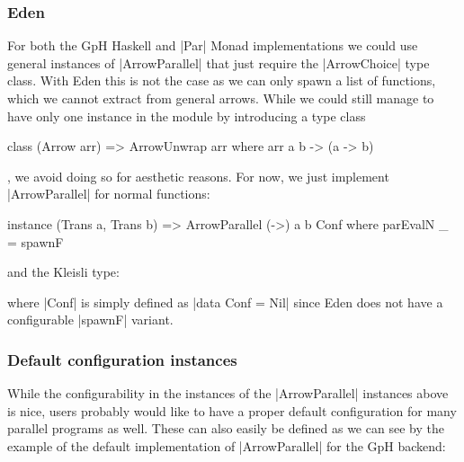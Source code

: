 \subsubsection{Eden}
For both the GpH Haskell and |Par| Monad implementations we could use general instances of |ArrowParallel| that just require the |ArrowChoice| type class. With Eden this is not the case as we can only spawn a list of functions, which we cannot extract from general arrows. While we could still manage to have only one instance in the module by introducing a type class %
\begin{code}
class (Arrow arr) => ArrowUnwrap arr where
	arr a b -> (a -> b)
\end{code}
, we avoid doing so for aesthetic reasons. For now, we just implement |ArrowParallel| for normal functions: %
\begin{code}
instance (Trans a, Trans b) => ArrowParallel (->) a b Conf where
    parEvalN _ = spawnF
\end{code}
and the Kleisli type: %
where |Conf| is simply defined as |data Conf = Nil| since Eden does not have a configurable |spawnF| variant.

\subsubsection{Default configuration instances}
While the configurability in the instances of the |ArrowParallel| instances above is nice, users probably would like to have a proper default configuration for many parallel programs as well. These can also easily be defined as we can see by the example of the default implementation of |ArrowParallel| for the GpH backend:

